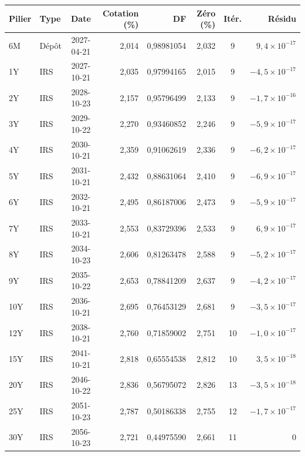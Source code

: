 \begin{tabular}{@{}llcrrrcr@{}}
\toprule
Pilier & Type & Date & Cotation (\%) & DF & Zéro (\%) & Itér. & Résidu \\
\midrule
6M & Dépôt & 2027-04-21 & 2{,}014 & 0{,}98981054 & 2{,}032 & 9 & $9{,}4\times10^{-17}$ \\
1Y & IRS & 2027-10-21 & 2{,}035 & 0{,}97994165 & 2{,}015 & 9 & $-4{,}5\times10^{-17}$ \\
2Y & IRS & 2028-10-23 & 2{,}157 & 0{,}95796499 & 2{,}133 & 9 & $-1{,}7\times10^{-16}$ \\
3Y & IRS & 2029-10-22 & 2{,}270 & 0{,}93460852 & 2{,}246 & 9 & $-5{,}9\times10^{-17}$ \\
4Y & IRS & 2030-10-21 & 2{,}359 & 0{,}91062619 & 2{,}336 & 9 & $-6{,}2\times10^{-17}$ \\
5Y & IRS & 2031-10-21 & 2{,}432 & 0{,}88631064 & 2{,}410 & 9 & $-6{,}9\times10^{-17}$ \\
6Y & IRS & 2032-10-21 & 2{,}495 & 0{,}86187006 & 2{,}473 & 9 & $-5{,}9\times10^{-17}$ \\
7Y & IRS & 2033-10-21 & 2{,}553 & 0{,}83729396 & 2{,}533 & 9 & $6{,}9\times10^{-17}$ \\
8Y & IRS & 2034-10-23 & 2{,}606 & 0{,}81263478 & 2{,}588 & 9 & $-5{,}2\times10^{-17}$ \\
9Y & IRS & 2035-10-22 & 2{,}653 & 0{,}78841209 & 2{,}637 & 9 & $-4{,}2\times10^{-17}$ \\
10Y & IRS & 2036-10-21 & 2{,}695 & 0{,}76453129 & 2{,}681 & 9 & $-3{,}5\times10^{-17}$ \\
12Y & IRS & 2038-10-21 & 2{,}760 & 0{,}71859002 & 2{,}751 & 10 & $-1{,}0\times10^{-17}$ \\
15Y & IRS & 2041-10-21 & 2{,}818 & 0{,}65554538 & 2{,}812 & 10 & $3{,}5\times10^{-18}$ \\
20Y & IRS & 2046-10-22 & 2{,}836 & 0{,}56795072 & 2{,}826 & 13 & $-3{,}5\times10^{-18}$ \\
25Y & IRS & 2051-10-23 & 2{,}787 & 0{,}50186338 & 2{,}755 & 12 & $-1{,}7\times10^{-17}$ \\
30Y & IRS & 2056-10-23 & 2{,}721 & 0{,}44975590 & 2{,}661 & 11 & $0$ \\
\bottomrule
\end{tabular}
